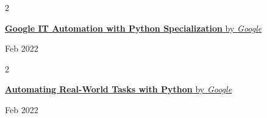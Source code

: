\documentclass[10pt, letterpaper]{article}
\newenvironment{twocolentry}[2][]{
    \onecolentry
    \def\secondColumn{#2}
    \setcolumnwidth{\fill, 4.5 cm}
    \begin{paracol}{2}
}{
    \switchcolumn \raggedleft \secondColumn
    \end{paracol}
    \endonecolentry
} %
\begin{document}
        \begin{twocolentry}
            {Feb 2022}
            \href{https://www.coursera.org/account/accomplishments/specialization/certificate/W6VVV4LRX95X}{\textbf{Google IT Automation with Python Specialization} by \textit{Google}}
        \end{twocolentry}
        
        \vspace{0.1 cm}
        
        \begin{twocolentry}
            {Feb 2022}
            \href{https://www.coursera.org/account/accomplishments/certificate/QTQ9MP8WD8U9}{\textbf{Automating Real-World Tasks with Python} by \textit{Google}}
        \end{twocolentry}
    
\end{document}
